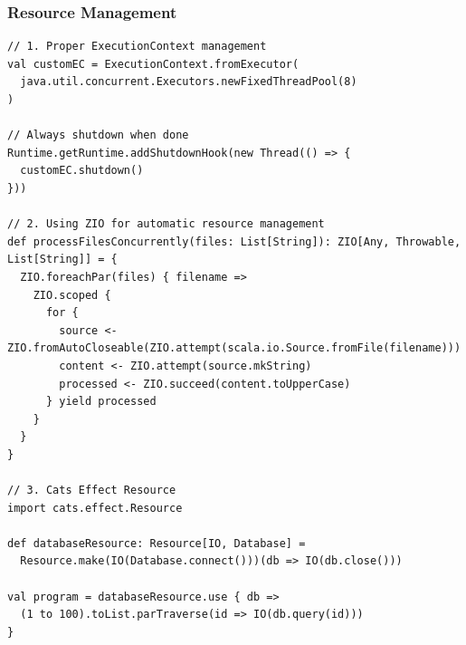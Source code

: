 \documentclass{beamer}
\begin{document}
\begin{frame}[fragile]
\frametitle{Resource Management}

\begin{lstlisting}[style=scalaStyle]
// 1. Proper ExecutionContext management
val customEC = ExecutionContext.fromExecutor(
  java.util.concurrent.Executors.newFixedThreadPool(8)
)

// Always shutdown when done
Runtime.getRuntime.addShutdownHook(new Thread(() => {
  customEC.shutdown()
}))

// 2. Using ZIO for automatic resource management
def processFilesConcurrently(files: List[String]): ZIO[Any, Throwable, List[String]] = {
  ZIO.foreachPar(files) { filename =>
    ZIO.scoped {
      for {
        source <- ZIO.fromAutoCloseable(ZIO.attempt(scala.io.Source.fromFile(filename)))
        content <- ZIO.attempt(source.mkString)
        processed <- ZIO.succeed(content.toUpperCase)
      } yield processed
    }
  }
}

// 3. Cats Effect Resource
import cats.effect.Resource

def databaseResource: Resource[IO, Database] = 
  Resource.make(IO(Database.connect()))(db => IO(db.close()))

val program = databaseResource.use { db =>
  (1 to 100).toList.parTraverse(id => IO(db.query(id)))
}
\end{lstlisting}

\end{frame}
\end{document}
